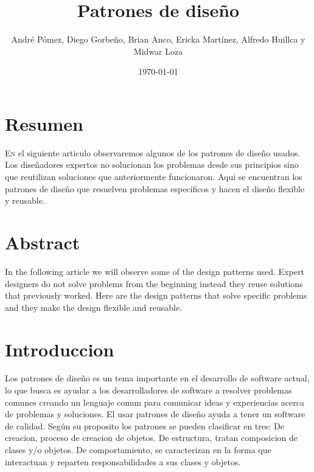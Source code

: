 \documentclass[twoside,twocolumn]{article}
\title{Patrones de diseño} %
\author{André Pómez, Diego Gorbeño, Brian Anco, Ericka Martínez, Alfredo Huillca y Midwar Loza}
\date{\today} %
\begin{document}
\maketitle


\section{Resumen}

\lettrine[nindent=0em,lines=3]{E}n el siguiente articulo observaremos algunos
de los patrones de diseño usados.
Los diseñadores  expertos no solucionan los problemas desde  sus principios
sino que reutilizan soluciones  que anteriormente funcionaron.
Aqui se encuentran los patrones de diseño que resuelven problemas especificos 
y hacen el diseño flexible  y reusable.




\section{Abstract}


In the following article we will observe some
of the design patterns used.
Expert designers do not solve problems from the beginning
instead they reuse solutions that previously worked.
Here are the design patterns that solve specific problems
and they make the design flexible and reusable.





\section{Introduccion}
Los patrones de diseño es un tema  importante  en el desarrollo  de software 
actual, lo que busca es ayudar  a los desarrolladores de software a resolver  problemas comunes
creando un lenguaje comun  para comunicar ideas  y experiencias acerca de problemas 
y soluciones.
El usar patrones de diseño ayuda a tener un software de calidad.
Según su proposito  los patrones se pueden clasificar en tres:
De creacion, proceso de creacion de objetos.
De estructura, tratan composicion de clases y/o objetos.
De comportamiento, se caracterizan en la forma que interactuan y reparten responsabilidades
 a sus clases y objetos.
\end{document}
